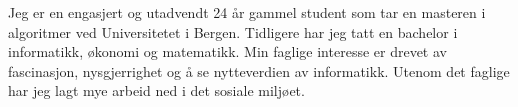%
%
%
\par{


Jeg er en engasjert og utadvendt 24 år gammel student som tar en masteren i algoritmer ved Universitetet i Bergen. Tidligere har jeg tatt en bachelor i informatikk, økonomi og matematikk. 
Min faglige interesse er drevet av fascinasjon, nysgjerrighet og å se nytteverdien av informatikk. Utenom det faglige har jeg lagt mye arbeid ned i det sosiale miljøet. 



}
